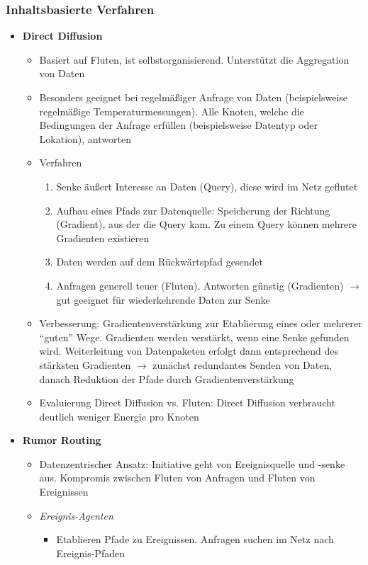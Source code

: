 \subsubsection{Inhaltsbasierte Verfahren}
\begin{itemize}
	\item \textbf{Direct Diffusion}
	\begin{itemize}
		\item Basiert auf Fluten, ist selbstorganisierend. Unterstützt die Aggregation von Daten
		\item Besonders geeignet bei regelmäßiger Anfrage von Daten (beispielsweise regelmäßige Temperaturmessungen). Alle Knoten, welche die Bedingungen der Anfrage erfüllen (beispielsweise Datentyp oder Lokation), antworten
		\item Verfahren
		\begin{enumerate}
			\item Senke äußert Interesse an Daten (Query), diese wird im Netz geflutet
			\item Aufbau eines Pfads zur Datenquelle: Speicherung der Richtung (Gradient), aus der die Query kam. Zu einem Query können mehrere Gradienten existieren
			\item Daten werden auf dem Rückwärtspfad gesendet
			\item Anfragen generell teuer (Fluten), Antworten günstig (Gradienten) \(\rightarrow\) gut geeignet für wiederkehrende Daten zur Senke
		\end{enumerate}
		\item Verbesserung: Gradientenverstärkung zur Etablierung eines oder mehrerer "`guten"' Wege. Gradienten werden verstärkt, wenn eine Senke gefunden wird. Weiterleitung von Datenpaketen erfolgt dann entsprechend des stärksten Gradienten \(\rightarrow\) zunächst redundantes Senden von Daten, danach Reduktion der Pfade durch Gradientenverstärkung
		\item Evaluierung Direct Diffusion vs. Fluten: Direct Diffusion verbraucht deutlich weniger Energie pro Knoten
	\end{itemize}
	\item \textbf{Rumor Routing}
	\begin{itemize}
		\item Datenzentrischer Ansatz: Initiative geht von Ereignisquelle und -senke aus. Kompromis zwischen Fluten von Anfragen und Fluten von Ereignissen
		\item \textit{Ereignis-Agenten}
		\begin{itemize}
			\item Etablieren Pfade zu Ereignissen. Anfragen suchen im Netz nach Ereignis-Pfaden

\end{itemize}
\end{itemize}
\end{itemize}
